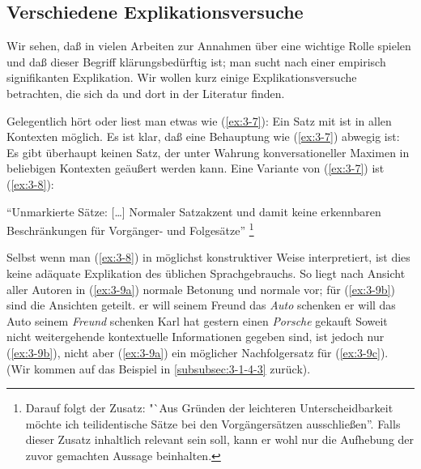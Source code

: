 \documentclass[output=paper]{langsci/langscibook}
\begin{document}
\subsection{Verschiedene Explikationsversuche}
\label{subsec:3-1-2}

Wir sehen, daß in vielen Arbeiten zur  Annahmen über  eine wichtige Rolle spielen und daß dieser Begriff klärungsbedürftig ist; man sucht nach einer empirisch signifikanten Explikation. Wir wollen kurz einige Explikationsversuche betrachten, die sich da und dort in der Literatur finden.

Gelegentlich hört oder liest man etwas wie (\ref{ex:3-7}):
\ea
\label{ex:3-7}
Ein Satz mit  ist in allen Kontexten möglich.
\z
Es ist klar, daß eine Behauptung wie (\ref{ex:3-7}) abwegig ist: Es gibt
überhaupt keinen Satz, der unter Wahrung konversationeller Maximen in beliebigen Kontexten geäußert werden kann. Eine Variante von (\ref{ex:3-7})
ist (\ref{ex:3-8}):
\begin{exe}
\ex \label{ex:3-8}
"`Unmarkierte Sätze: [\ldots{}] Normaler Satzakzent und damit keine
erkennbaren Beschränkungen für Vorgänger- und Folgesätze"'
\citep[38]{Altmann76}\footnote{\label{fn:3-1}%
	Darauf folgt der Zusatz: "`Aus Gründen der leichteren
  Unterscheidbarkeit möchte ich teilidentische Sätze bei den Vorgängersätzen ausschließen''. Falls
  dieser Zusatz inhaltlich relevant sein soll, kann er wohl nur die Aufhebung der zuvor gemachten
  Aussage beinhalten.%
} 
\end{exe}
Selbst wenn man (\ref{ex:3-8}) in möglichst konstruktiver Weise interpretiert,
ist dies keine adäquate Explikation des üblichen Sprachgebrauchs. So
liegt nach Ansicht aller Autoren in (\ref{ex:3-9a}) normale Betonung und normale
 vor; für (\ref{ex:3-9b}) sind die Ansichten geteilt.
\eal \label{ex:3-9}
\ex
\label{ex:3-9a}
er will seinem Freund das \textit{Auto} schenken
\ex
\label{ex:3-9b}
er will das Auto seinem \textit{Freund} schenken
\ex
\label{ex:3-9c}
Karl hat gestern einen \textit{Porsche} gekauft
\zl
Soweit nicht weitergehende kontextuelle Informationen gegeben sind,
ist jedoch nur (\ref{ex:3-9b}), nicht aber (\ref{ex:3-9a}) ein möglicher Nachfolgersatz
für (\ref{ex:3-9c}). (Wir kommen auf das Beispiel in \ref{subsubsec:3-1-4-3} zurück).
\end{document}
